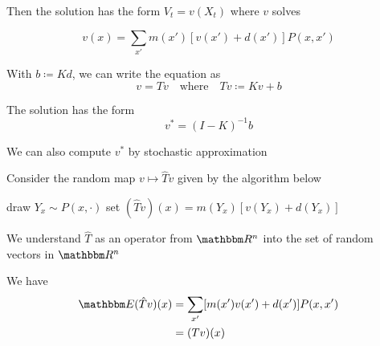 \documentclass[xcolor=dvipsnames]{beamer}  %
\newcommand{\1}{\mathbbm 1}
\newcommand{\RR}{\mathbbm R}
\newcommand{\EE}{\mathbbm E}
\newcommand{\XX}{\mathsf X}
\begin{document}
\begin{frame}
    
    Then the solution has the form $V_t = v(X_t)$ where $v$ solves

    \begin{equation*}
        v(x) = \sum_{x'} m(x') [v(x') + d(x')]  P(x,x') 
    \end{equation*}

            \vspace{0.5em}
    With $b \coloneq Kd$, we can write the equation as 
    \begin{equation*}
        v = Tv 
        \quad \text{where} \quad
        Tv \coloneq Kv + b
    \end{equation*}

            \vspace{0.5em}
    The solution has the form
    \begin{equation*}
        v^* = (I - K)^{-1} b
    \end{equation*}

\end{frame}

\begin{frame}[fragile]
    
    We can also compute $v^*$ by stochastic approximation

    Consider the random map $v \mapsto \hat Tv$ given by
    the algorithm below

    \begin{algorithm}[H]
        \DontPrintSemicolon
        \For{$x \in \XX$}
        {
            draw $Y_x \sim P(x, \cdot)$ \;
            set $(\hat Tv)(x) = m(Y_x)[v(Y_x) + d(Y_x)]$
        }
    \end{algorithm}

    We understand $\hat T$ as an operator from $\RR^n$ into the set of random
    vectors in $\RR^n$
    
    We have
    \begin{align*}
        \EE (\hat Tv)(x) 
        & = \sum_{x'} [m(x')v(x') + d(x')] P(x, x')
        \\
        & = (Tv)(x)
    \end{align*}

\end{frame}
\end{document}
